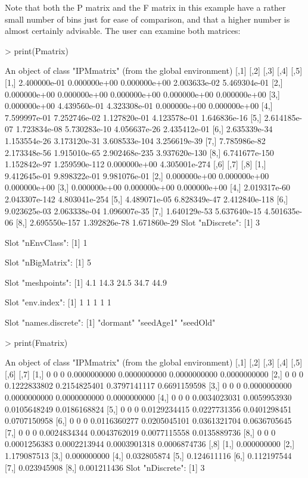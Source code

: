 \documentclass{article}
\begin{document}
Note that both the P matrix and the F matrix in this example have a rather small number of bins just for ease of comparison, and that a higher number is almost certainly advisable. The user can examine both matrices: 
\begin{Schunk}
\begin{Sinput}
> print(Pmatrix)
\end{Sinput}
\begin{Soutput}
An object of class "IPMmatrix" (from the global environment)
              [,1]         [,2]          [,3]          [,4]          [,5]
[1,]  2.400000e-01 0.000000e+00  0.000000e+00  2.003633e-02  5.469304e-01
[2,]  0.000000e+00 0.000000e+00  0.000000e+00  0.000000e+00  0.000000e+00
[3,]  0.000000e+00 4.439560e-01  4.323308e-01  0.000000e+00  0.000000e+00
[4,]  7.599997e-01 7.252746e-02  1.127820e-01  4.123578e-01  1.646836e-16
[5,]  2.614185e-07 1.723834e-08  5.730283e-10  4.056637e-26  2.435412e-01
[6,]  2.635339e-34 1.153554e-26  3.173120e-31 3.608533e-104  3.256619e-39
[7,]  7.785986e-82 2.173348e-56  1.915010e-65 2.902468e-235 3.937620e-130
[8,] 6.741677e-150 1.152842e-97 1.259590e-112  0.000000e+00 4.305001e-274
              [,6]          [,7]          [,8]
[1,]  9.412645e-01  9.898322e-01  9.981076e-01
[2,]  0.000000e+00  0.000000e+00  0.000000e+00
[3,]  0.000000e+00  0.000000e+00  0.000000e+00
[4,]  2.019317e-60 2.043307e-142 4.803041e-254
[5,]  4.489071e-05  6.828349e-47 2.412840e-118
[6,]  9.023625e-03  2.063338e-04  1.096007e-35
[7,]  1.640129e-53  5.637640e-15  4.501635e-06
[8,] 2.695550e-157  1.392826e-78  1.671860e-29
Slot "nDiscrete":
[1] 3

Slot "nEnvClass":
[1] 1

Slot "nBigMatrix":
[1] 5

Slot "meshpoints":
[1]  4.1 14.3 24.5 34.7 44.9

Slot "env.index":
[1] 1 1 1 1 1

Slot "names.discrete":
[1] "dormant"  "seedAge1" "seedOld" 
\end{Soutput}
\begin{Sinput}
> print(Fmatrix)
\end{Sinput}
\begin{Soutput}
An object of class "IPMmatrix" (from the global environment)
     [,1] [,2] [,3]         [,4]         [,5]         [,6]         [,7]
[1,]    0    0    0 0.0000000000 0.0000000000 0.0000000000 0.0000000000
[2,]    0    0    0 0.1222833802 0.2154825401 0.3797141117 0.6691159598
[3,]    0    0    0 0.0000000000 0.0000000000 0.0000000000 0.0000000000
[4,]    0    0    0 0.0034023031 0.0059953930 0.0105648249 0.0186168824
[5,]    0    0    0 0.0129234415 0.0227731356 0.0401298451 0.0707150958
[6,]    0    0    0 0.0116360277 0.0205045101 0.0361321704 0.0636705645
[7,]    0    0    0 0.0024834344 0.0043762019 0.0077115558 0.0135889736
[8,]    0    0    0 0.0001256383 0.0002213944 0.0003901318 0.0006874736
            [,8]
[1,] 0.000000000
[2,] 1.179087513
[3,] 0.000000000
[4,] 0.032805874
[5,] 0.124611116
[6,] 0.112197544
[7,] 0.023945908
[8,] 0.001211436
Slot "nDiscrete":
[1] 3


\end{Soutput}
\end{Schunk}
\end{document}
